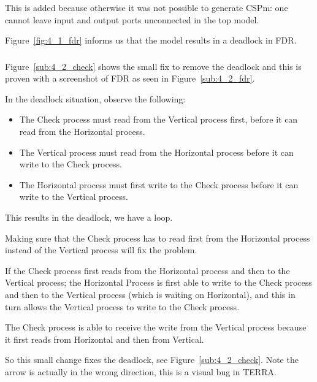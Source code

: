\documentclass[a4paper,twoside,11pt]{article}
\begin{document}
This is added because otherwise it was not possible to generate CSPm: one 
cannot leave input and output ports unconnected in the top model.

Figure~\ref{fig:4_1_fdr} informs us that the model results in a deadlock in FDR.

\subsubsection{}
Figure~\ref{sub:4_2_check} shows the small fix to remove the deadlock and this 
is proven with a screenshot of FDR as seen in Figure~\ref{sub:4_2_fdr}. 

In the deadlock situation, observe the following:

\begin{itemize}
	\item The Check process must read from the Vertical process first,
		before it can read from the Horizontal process.

	\item The Vertical process must read from the Horizontal process before
	       	it can write to the Check process.

	\item The Horizontal process must first write to the Check process before 
		it can write to the Vertical process.
\end{itemize}
This results in the deadlock, we have a loop.
\smallskip

Making sure that the Check process has to read first from the Horizontal process 
instead of the Vertical process will fix the problem.

If the Check process first reads from the Horizontal process and then to the Vertical
process; the Horizontal Process is first able to write to the Check process and 
then to the Vertical process 
(which is waiting on Horizontal), and this in turn allows the Vertical process to write to the Check process.

The Check process is able to receive the write from the Vertical process because it first reads from Horizontal and then from Vertical.

\smallskip
So this small change fixes the deadlock, see Figure~\ref{sub:4_2_check}.
Note the arrow is actually in the wrong direction, this is a visual bug in TERRA.
\end{document}

